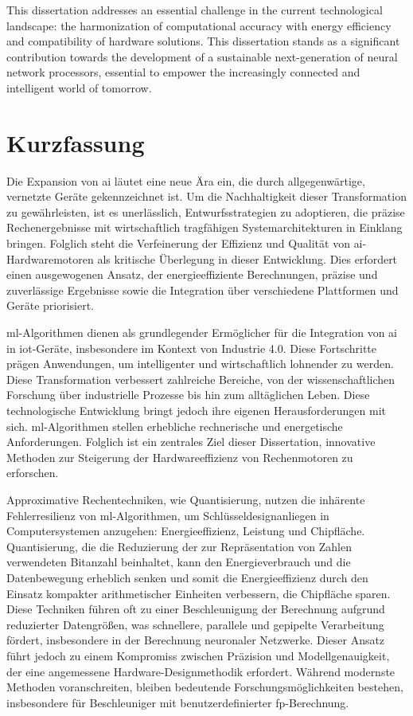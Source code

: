 This dissertation addresses an essential challenge in the current technological landscape: the harmonization of computational accuracy with energy efficiency and compatibility of hardware solutions. This dissertation stands as a significant contribution towards the development of a sustainable next-generation of neural network processors, essential to empower the increasingly connected and intelligent world of tomorrow.

\chapter*{Kurzfassung}
\thispagestyle{empty}

Die Expansion von \gls{ai} l\"autet eine neue \"Ara ein, die durch allgegenw\"artige, vernetzte Ger\"ate gekennzeichnet ist. Um die Nachhaltigkeit dieser Transformation zu gew\"ahrleisten, ist es unerl\"asslich, Entwurfsstrategien zu adoptieren, die pr\"azise Rechenergebnisse mit wirtschaftlich tragf\"ahigen Systemarchitekturen in Einklang bringen. Folglich steht die Verfeinerung der Effizienz und Qualit\"at von \gls{ai}-Hardwaremotoren als kritische \"Uberlegung in dieser Entwicklung. Dies erfordert einen ausgewogenen Ansatz, der energieeffiziente Berechnungen, pr\"azise und zuverl\"assige Ergebnisse sowie die Integration \"uber verschiedene Plattformen und Ger\"ate priorisiert.

\gls{ml}-Algorithmen dienen als grundlegender Erm\"oglicher f\"ur die Integration von \gls{ai} in \gls{iot}-Ger\"ate, insbesondere im Kontext von Industrie 4.0. Diese Fortschritte pr\"agen Anwendungen, um intelligenter und wirtschaftlich lohnender zu werden. Diese Transformation verbessert zahlreiche Bereiche, von der wissenschaftlichen Forschung \"uber industrielle Prozesse bis hin zum allt\"aglichen Leben. Diese technologische Entwicklung bringt jedoch ihre eigenen Herausforderungen mit sich. \gls{ml}-Algorithmen stellen erhebliche rechnerische und energetische Anforderungen. Folglich ist ein zentrales Ziel dieser Dissertation, innovative Methoden zur Steigerung der Hardwareeffizienz von Rechenmotoren zu erforschen.

Approximative Rechentechniken, wie Quantisierung, nutzen die inh\"arente Fehlerresilienz von \gls{ml}-Algorithmen, um Schl\"usseldesignanliegen in Computersystemen anzugehen: Energieeffizienz, Leistung und Chipfl\"ache. Quantisierung, die die Reduzierung der zur Repr\"asentation von Zahlen verwendeten Bitanzahl beinhaltet, kann den Energieverbrauch und die Datenbewegung erheblich senken und somit die Energieeffizienz durch den Einsatz kompakter arithmetischer Einheiten verbessern, die Chipfl\"ache sparen. Diese Techniken f\"uhren oft zu einer Beschleunigung der Berechnung aufgrund reduzierter Datengr\"o\ss{}en, was schnellere, parallele und gepipelte Verarbeitung f\"ordert, insbesondere in der Berechnung neuronaler Netzwerke. Dieser Ansatz f\"uhrt jedoch zu einem Kompromiss zwischen Pr\"azision und Modellgenauigkeit, der eine angemessene Hardware-Designmethodik erfordert. W\"ahrend modernste Methoden voranschreiten, bleiben bedeutende Forschungsm\"oglichkeiten bestehen, insbesondere f\"ur Beschleuniger mit benutzerdefinierter \gls{fp}-Berechnung.

